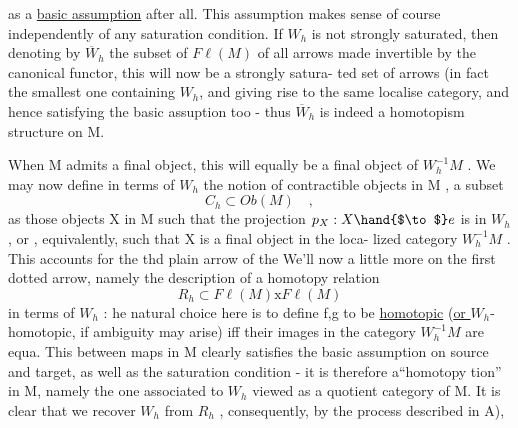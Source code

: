 
as a \uline{basic assumption} after all.  This assumption makes sense of course
independently of any saturation condition.  If $W_h$ is not  strongly
saturated,  then denoting by $\overline{W}_h$ the subset of $F\ell(M)$ of all arrows made
invertible by the canonical functor,  this will now be a strongly satura-%
ted set of arrows (in fact the smallest one containing $W_h$\deleted{)},  and giving
rise to the same localise category,  and hence satisfying the basic 
assuption too\hand{)} -  thus $\overline{W}_h$ is indeed a homotopism structure on M.

When M admits a final object,  this will equally be a final object of
$W_h^{-1}M$ . We may now define in terms of $W_h$  the notion of contractible
 objects in M ,  a subset
\[ C_h \subset Ob(M) \quad , \]
as those objects X in M such that  the projection $p_X : X \hand{$\to$} e$ is in $W_h$ ,
or , equivalently,  such that X is  a final object in the loca-%
lized category $W_h^{-1}M$ .  This accounts for the thd plain arrow of the
\hand{$\lceil$} We'll now  a little more on the first dotted arrow,
namely the description of a homotopy relation
\[ R_h \subset F\ell(M)\mathrm{x}F\ell(M) \]
in terms of $W_h$ :  he natural choice here is to define  f,g\hand{$\in$}  to
be \uline{homotopic} (\uline{or $W_h$}-homotopic, if ambiguity may arise)  iff their images
in the category $W_h^{-1}M$  are equa.  This  between maps
in M clearly satisfies the basic assumption on source and target,  as well
as the saturation condition  -  it is  therefore a``homotopy tion'' in M,
 namely the one associated to $W_h$ viewed as a quotient category of M.
It is clear that we recover $W_h$ from $R_h$ ,  consequently,  by the process
described in A),  

